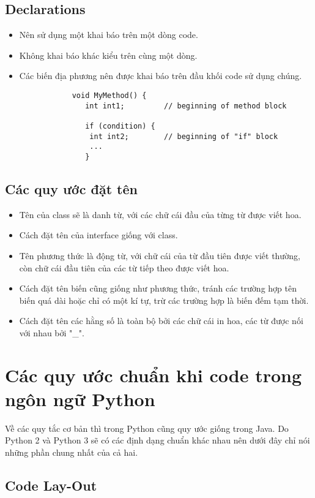 \documentclass[a4paper]{report}
\begin{document}
	\section{Declarations}
	\begin{itemize}
		\item Nên sử dụng một khai báo trên một dòng code.
		\item Không khai báo khác kiểu trên cùng một dòng.
		\item Các biến địa phương nên được khai báo trên đầu khối code sử dụng chúng.
		\begin{verbatim}
			void MyMethod() {
			   int int1;         // beginning of method block
			
			   if (condition) {
			    int int2;        // beginning of "if" block
			    ...
			   }
		\end{verbatim}
	\end{itemize}
	\section{Các quy ước đặt tên}
	\begin{itemize}
		\item Tên của class sẽ là danh từ, với các chữ cái đầu của từng từ được viết hoa.
		\item Cách đặt tên của interface giống với class.
		\item Tên phương thức là động từ, với chữ cái của từ đầu tiên được viết thường, còn 
		chữ cái đầu tiên của các từ tiếp theo được viết hoa.
		\item Cách đặt tên biến cũng giống như phương thức, tránh các trường hợp tên biến 
		quá dài hoặc chỉ có một kí tự, trừ các trường hợp là biến đếm tạm thời.
		\item Cách đặt tên các hằng số là toàn bộ bởi các chữ cái in hoa, các từ được nối 
		với nhau bởi "\_".
	\end{itemize}
	\chapter{Các quy ước chuẩn khi code trong ngôn ngữ Python}
	Về các quy tắc cơ bản thì trong Python cũng quy ước giống trong Java.
	 Do Python 2 và Python 3 sẽ có các định dạng 
	chuẩn khác nhau nên dưới đây chỉ nói những phần chung nhất của cả hai.
	\section{Code Lay-Out}
\end{document}
